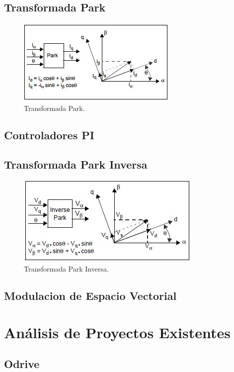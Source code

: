 \documentclass[11pt]{report}
\begin{document}
\subsection{Transformada Park}
\begin{figure}[ht]
	\centering
	\includegraphics{imagenes/park.jpg}
	\caption{Transformada Park.}
\end{figure}
\FloatBarrier

\subsection{Controladores PI}

\subsection{Transformada Park Inversa}
\begin{figure}[ht]
	\centering
	\includegraphics{imagenes/park_inv.jpg}
	\caption{Transformada Park Inversa.}
\end{figure}

\subsection{Modulacion de Espacio Vectorial}

\newpage
\section{Análisis de Proyectos Existentes}
\subsection{Odrive}
\end{document}

